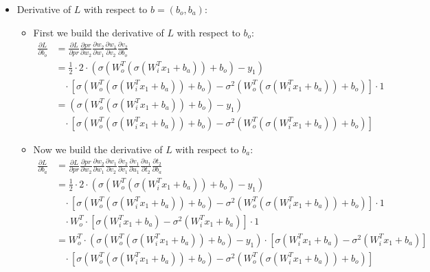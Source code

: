 \documentclass[a4paper]{article}
\begin{document}
\begin{itemize}
            \item Derivative of $L$ with respect to $b = (b_o, b_a)$:
                \begin{itemize}
                    \item First we build the derivative of $L$ with respect to $b_o$:
                        \begin{align*}
                            \frac{\partial L}{\partial b_o} &= \frac{\partial L}{\partial pr} \frac{\partial pr}{\partial w_2} 
                            \frac{\partial w_2}{\partial w_1} \frac{\partial w_1}{\partial v_2} \frac{\partial v_2}{\partial b_o}\\
                            &= \frac{1}{2} \cdot 2 \cdot (\sigma(W_o^T(\sigma(W_i^T x_1 + b_a)) + b_o) - y_1)\\
                            &\ \ \ \ \cdot [\sigma(W_o^T(\sigma(W_i^T x_1 + b_a)) + b_o) - \sigma^2(W_o^T(\sigma(W_i^T x_1 + b_a)) + b_o)] \cdot 1\\
                            &= (\sigma(W_o^T(\sigma(W_i^T x_1 + b_a)) + b_o) - y_1)\\
                            &\ \ \ \ \cdot [\sigma(W_o^T(\sigma(W_i^T x_1 + b_a)) + b_o) - \sigma^2(W_o^T(\sigma(W_i^T x_1 + b_a)) + b_o)]
                        \end{align*}
                    \item Now we build the derivative of $L$ with respect to $b_a$:
                        \begin{align*}
                            \frac{\partial L}{\partial b_a} &= \frac{\partial L}{\partial pr} \frac{\partial pr}{\partial w_2} 
                            \frac{\partial w_2}{\partial w_1} \frac{\partial w_1}{\partial v_2} \frac{\partial v_2}{\partial v_1}
                            \frac{\partial v_1}{\partial u_1} \frac{\partial u_1}{\partial t_2} \frac{\partial t_2}{\partial b_a}\\
                            &= \frac{1}{2} \cdot 2 \cdot (\sigma(W_o^T(\sigma(W_i^T x_1 + b_a)) + b_o) - y_1)\\
                            &\ \ \ \ \cdot [\sigma(W_o^T(\sigma(W_i^T x_1 + b_a)) + b_o) - \sigma^2(W_o^T(\sigma(W_i^T x_1 + b_a)) + b_o)] \cdot 1\\
                            &\ \ \ \ \cdot W_o^T \cdot [\sigma(W_i^T x_1 + b_a) - \sigma^2(W_i^T x_1 + b_a)] \cdot 1\\
                            &= W_o^T  \cdot (\sigma(W_o^T(\sigma(W_i^T x_1 + b_a)) + b_o) - y_1) \cdot [\sigma(W_i^T x_1 + b_a) - \sigma^2(W_i^T x_1 + b_a)]\\
                            &\ \ \ \ \cdot [\sigma(W_o^T(\sigma(W_i^T x_1 + b_a)) + b_o) - \sigma^2(W_o^T(\sigma(W_i^T x_1 + b_a)) + b_o)]
                        \end{align*}
                \end{itemize}
        \end{itemize}
\end{document}
